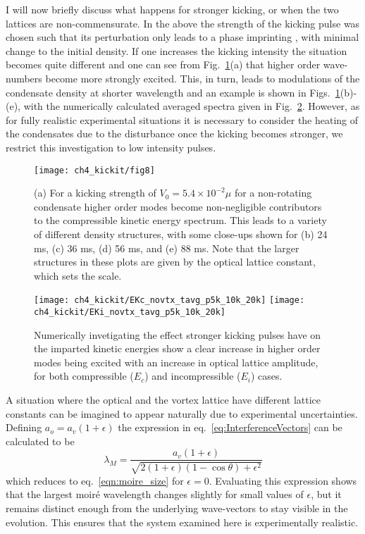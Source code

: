     I will now briefly discuss what happens for stronger kicking, or when the two lattices are non-commensurate. In the above the strength of the kicking pulse was chosen such that its perturbation only leads to a phase imprinting \cite{Vtx:Dobrek_pra_1999,BEC:Denschlag_sci_2000}, with minimal change to the initial density. If one increases the kicking intensity the situation becomes quite different and one can see from Fig.~\ref{fig:kickp20k}(a) that higher order wave-numbers become more strongly excited. This, in turn, leads to modulations of the condensate density at shorter wavelength and an example is shown in Figs.~\ref{fig:kickp20k}(b)-(e), with the numerically calculated averaged spectra given in Fig.~\ref{fig:kick_compare_spec}. However, as for fully realistic experimental situations it is necessary to consider the heating of the condensates due to the disturbance once the kicking becomes stronger, we restrict this investigation to low intensity pulses.

\begin{figure}[tb]
    \centering
	\texttt{[image: ch4\_kickit/fig8]}
	\caption[Higher order modes induced by stronger kicking.]{(a) For a kicking strength of $V_0 = 5.4\times10^{-2}\mu$ for a non-rotating condensate higher order modes become non-negligible contributors to the compressible kinetic energy spectrum. This leads to a variety of different density structures, with some close-ups shown for (b) 24 ms, (c) 36 ms, (d) 56 ms, and (e) 88 ms. Note that the larger structures in these plots are given by the optical lattice constant, which sets the scale.}
	\label{fig:kickp20k}
\end{figure}
\begin{figure}[tb]
    \centering
    \texttt{[image: ch4\_kickit/EKc\_novtx\_tavg\_p5k\_10k\_20k]}
    \texttt{[image: ch4\_kickit/EKi\_novtx\_tavg\_p5k\_10k\_20k]}
	\caption[Comparison of kinetic energy spectra for increased kicking strengths.]{Numerically invetigating the effect stronger kicking pulses have on the imparted kinetic energies show a clear increase in higher order modes being excited with an increase in optical lattice amplitude, for both compressible ($E_c$) and incompressible ($E_i$) cases.}\label{fig:kick_compare_spec}
\end{figure}

    A situation where the optical and the vortex lattice have different lattice constants can be imagined to appear naturally due to experimental uncertainties. Defining $a_o = a_v(1+\epsilon)$ the expression in eq.~\eqref{eq:InterferenceVectors} can be calculated to be
    \begin{equation}
    	\lambda_M = \frac{a_v(1+\epsilon)}{\sqrt{2(1+\epsilon)(1-\cos\theta) + \epsilon^2}}
    	\label{eqn:moire_size_eps}
    \end{equation}
    which reduces to eq.~\eqref{eqn:moire_size} for $\epsilon=0$. Evaluating this expression shows that the largest moir\'e wavelength changes slightly for small values of $\epsilon$, but it remains distinct enough from the underlying wave-vectors to stay visible in the evolution. This ensures that the system examined here is experimentally realistic.

